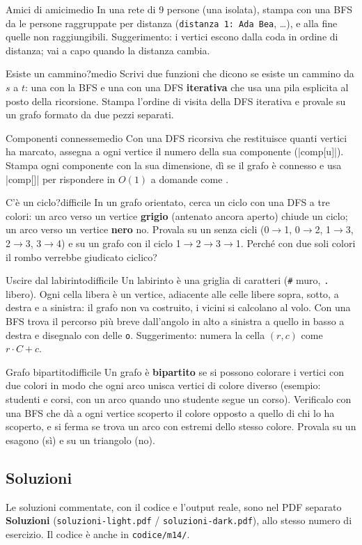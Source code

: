 \begin{esercizio}{Amici di amici}{medio}
In una rete di 9 persone (una isolata), stampa con una BFS da  le persone raggruppate
per distanza (\texttt{distanza 1: Ada Bea}, \ldots), e alla fine quelle non raggiungibili.
Suggerimento: i vertici escono dalla coda in ordine di distanza; vai a capo quando la
distanza cambia.
\end{esercizio}

\begin{esercizio}{Esiste un cammino?}{medio}
Scrivi due funzioni che dicono se esiste un cammino da $s$ a $t$: una con la BFS e una con
una DFS \textbf{iterativa} che usa una pila esplicita al posto della ricorsione. Stampa
l'ordine di visita della DFS iterativa e provale su un grafo formato da due pezzi
separati.
\end{esercizio}

\begin{esercizio}{Componenti connesse}{medio}
Con una DFS ricorsiva che restituisce quanti vertici ha marcato, assegna a ogni vertice il
numero della sua componente (\cc|comp[u]|). Stampa ogni componente con la sua dimensione,
dì se il grafo è connesso e usa \cc|comp[]| per rispondere in $O(1)$ a domande come
.
\end{esercizio}

\begin{esercizio}{C'è un ciclo?}{difficile}
In un grafo orientato, cerca un ciclo con una DFS a tre colori: un arco verso un vertice
\textbf{grigio} (antenato ancora aperto) chiude un ciclo; un arco verso un vertice
\textbf{nero} no. Provala su un  senza cicli (0$\to$1, 0$\to$2, 1$\to$3, 2$\to$3,
3$\to$4) e su un grafo con il ciclo 1$\to$2$\to$3$\to$1. Perché con due soli colori il
rombo verrebbe giudicato ciclico?
\end{esercizio}

\begin{esercizio}{Uscire dal labirinto}{difficile}
Un labirinto è una griglia di caratteri (\texttt{\#} muro, \texttt{.} libero). Ogni cella
libera è un vertice, adiacente alle celle libere sopra, sotto, a destra e a sinistra: il
grafo non va costruito, i vicini si calcolano al volo. Con una BFS trova il percorso più
breve dall'angolo in alto a sinistra a quello in basso a destra e disegnalo con delle
\texttt{o}. Suggerimento: numera la cella $(r, c)$ come $r \cdot C + c$.
\end{esercizio}

\begin{esercizio}{Grafo bipartito}{difficile}
Un grafo è \textbf{bipartito} se si possono colorare i vertici con due colori in modo che
ogni arco unisca vertici di colore diverso (esempio: studenti e corsi, con un arco
quando uno studente segue un corso). Verificalo con una BFS che dà a ogni vertice scoperto
il colore opposto a quello di chi lo ha scoperto, e si ferma se trova un arco con estremi
dello stesso colore. Provala su un esagono (sì) e su un triangolo (no).
\end{esercizio}

\subsection*{Soluzioni}
Le soluzioni commentate, con il codice e l'output reale, sono nel PDF separato
\textbf{Soluzioni} (\texttt{soluzioni-light.pdf} / \texttt{soluzioni-dark.pdf}),
allo stesso numero di esercizio. Il codice è anche in \texttt{codice/m14/}.

